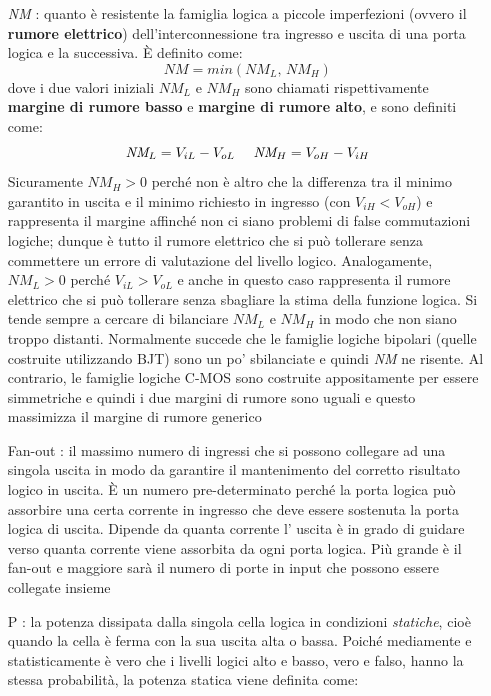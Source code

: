 \documentclass[12pt, a4paper]{report}
\begin{document}
\begin{itemize}
    \item[\textit{NM}]: quanto è resistente la famiglia logica a piccole imperfezioni (ovvero il \textbf{rumore elettrico}) dell'interconnessione tra ingresso e uscita di una porta logica e la successiva. È definito come:
    \begin{equation}
        \textit{NM} = min(\textit{NM}_{L},\, \textit{NM}_{H})
    \end{equation}
    dove i  due valori iniziali $\textit{NM}_{L}$ e $\textit{NM}_{H}$ sono chiamati rispettivamente \textbf{margine di rumore basso} e \textbf{margine di rumore alto}, e sono definiti come:
    \begin{equation*}
        \textit{NM}_{L} = V_{iL} - V_{oL} \text{ \, \, }  \textit{NM}_{H} = V_{oH} - V_{iH}
    \end{equation*}
    Sicuramente $\textit{NM}_{H} > 0$ perché non è altro che la differenza tra il minimo garantito in uscita e il minimo richiesto in ingresso (con $V_{iH} < V_{oH}$) e rappresenta il margine affinché non ci siano problemi di false commutazioni logiche; dunque è tutto il rumore elettrico che si può tollerare senza commettere un errore di valutazione del livello logico. Analogamente, $\textit{NM}_{L} > 0$ perché $V_{iL} > V_{oL}$ e anche in questo caso rappresenta il rumore elettrico che si può tollerare senza sbagliare la stima della funzione logica. Si tende sempre a cercare di bilanciare $\textit{NM}_{L}$ e $\textit{NM}_{H}$ in modo che non siano troppo distanti. Normalmente succede che le famiglie logiche bipolari (quelle costruite utilizzando BJT) sono un po' sbilanciate e quindi \textit{NM} ne risente. Al contrario, le famiglie logiche C-MOS sono costruite appositamente per essere simmetriche e quindi i due margini di rumore sono uguali e questo massimizza il margine di rumore generico
    \item[Fan-out]: il massimo numero di ingressi che si possono collegare ad una singola uscita in modo da garantire il mantenimento del corretto risultato logico in uscita. È un numero pre-determinato perché la porta logica può assorbire una certa corrente in ingresso che deve essere sostenuta la porta logica di uscita. Dipende da quanta corrente l' uscita è in grado di guidare verso quanta corrente viene assorbita da ogni porta logica. Più grande è il fan-out e maggiore sarà il numero di porte in input che possono essere collegate insieme
    \item[P]: la potenza dissipata dalla singola cella logica in condizioni \textit{statiche}, cioè quando la cella è ferma con la sua uscita alta o bassa. Poiché mediamente e statisticamente è vero che i livelli logici alto e basso, vero e falso, hanno la stessa probabilità, la potenza statica viene definita come:

\end{itemize}
\end{document}
